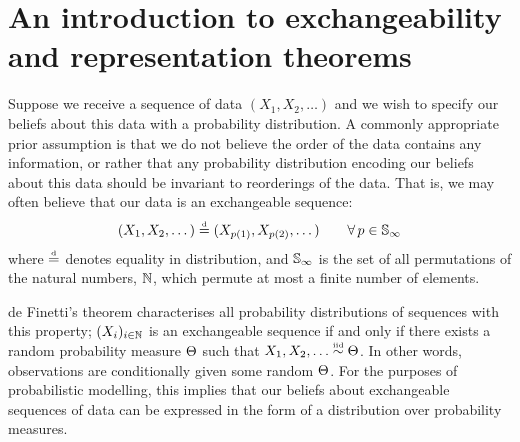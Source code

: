 
\section{An introduction to exchangeability and representation theorems}

Suppose we receive a sequence of data $(X_1, X_2, \dots)$ and we wish to specify our beliefs about this data with a probability distribution.
A commonly appropriate prior assumption is that we do not believe the order of the data contains any information, or rather that any probability distribution encoding our beliefs about this data should be invariant to reorderings of the data.
That is, we may often believe that our data is an exchangeable sequence:
\[
  \label{eq:intro:exch}
  (X_1, X_2, \dots) \stackrel{\mbox{\tiny d}}{=} (X_{p(1)}, X_{p(2)}, \dots) \qquad \forall\, p\in\mathbb{S}_{\infty}
\]
where $\stackrel{\mbox{\tiny d}}{=}$ denotes equality in distribution, and $\mathbb{S}_{\infty}$ is the set of all permutations of the natural numbers, $\mathbb{N}$, which permute at most a finite number of elements.

de Finetti's theorem \citep[e.g.][]{Kallenberg2005-ec} characterises all probability distributions of sequences with this property;  $(X_i)_{i\in\mathbb{N}}$ is an exchangeable sequence if and only if there exists a random probability measure $\Theta$ such that $X_1,X_2,\ldots\overset{\mbox{\tiny iid}}{\sim}\Theta$.
In other words, observations are conditionally \iid given some random $\Theta$.
For the purposes of probabilistic modelling, this implies that our beliefs about exchangeable sequences of data can be expressed in the form of a distribution over probability measures.

